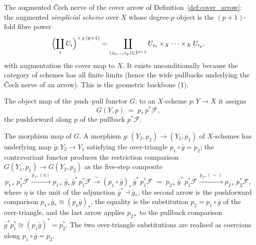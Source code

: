 \begin{definition}
  \label{def:cover_cech_nerve}
  The augmented {\v C}ech nerve of the cover arrow of
  Definition~\ref{def:cover_arrow}: the augmented \emph{simplicial scheme} over
  \(X\) whose degree-\(p\) object is the \((p+1)\)-fold fibre power
  \[
    \Bigl(\coprod_{i} U_i\Bigr)^{\times_X (p+1)}
      = \coprod_{(i_0, \ldots, i_p) \in I^{p+1}}
        U_{i_0} \times_X \cdots \times_X U_{i_p},
  \]
  with augmentation the cover map to \(X\). It exists unconditionally because the
  category of schemes has all finite limits (hence the wide pullbacks underlying the
  {\v C}ech nerve of an arrow). This is the geometric backbone (1).
\end{definition}

\begin{definition}\leanok
  \label{def:push_pull_obj}
  The object map of the push--pull functor \(G\): to an \(X\)-scheme
  \(p : Y \to X\) it assigns
  \[
    G(Y, p) \;=\; p_*\, p^*\mathcal{F},
  \]
  the pushforward along \(p\) of the pullback \(p^*\mathcal{F}\).
\end{definition}

\begin{definition}
  \label{def:push_pull_map}
  The morphism map of \(G\). A morphism \(g : (Y_2, p_2) \to (Y_1, p_1)\) of
  \(X\)-schemes has underlying map \(\bar g : Y_2 \to Y_1\) satisfying the
  over-triangle \(p_1 \circ \bar g = p_2\); the contravariant functor produces the
  restriction comparison \(G(Y_1, p_1) \to G(Y_2, p_2)\) as the five-step composite
  \[
    p_{1*}\,p_1^*\mathcal{F}
      \xrightarrow{\,p_{1*}(\eta)\,}
    p_{1*}\,\bar g_*\,\bar g^*\,p_1^*\mathcal{F}
      \xrightarrow{\,\sim\,}
    (p_1 \circ \bar g)_*\,\bar g^*\,p_1^*\mathcal{F}
      \;=\;
    p_{2*}\,\bar g^*\,p_1^*\mathcal{F}
      \xrightarrow{\,p_{2*}(\sim)\,}
    p_{2*}\,p_2^*\mathcal{F},
  \]
  where \(\eta\) is the unit of the adjunction \(\bar g^* \dashv \bar g_*\), the
  second arrow is the pushforward comparison \(p_{1*}\bar g_* \cong (p_1 \bar g)_*\),
  the equality is the substitution \(p_2 = p_1 \circ \bar g\) of the over-triangle,
  and the last arrow applies \(p_{2*}\) to the pullback comparison
  \(\bar g^* p_1^* \cong (p_1 \bar g)^* = p_2^*\). The two over-triangle
  substitutions are realised as coercions along \(p_1 \circ \bar g = p_2\).
\end{definition}

